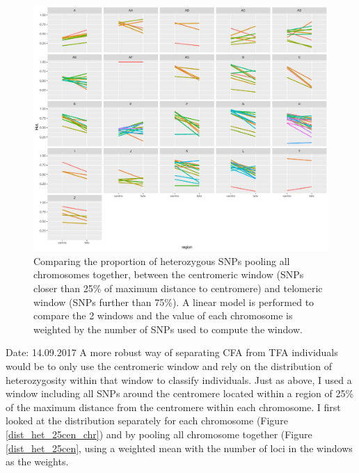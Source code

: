 \documentclass[10pt,a4paper]{report}
\begin{document}
\begin{figure}[h]
	\begin{center}
		\includegraphics[width=1\textwidth]{Num_CSD_loci/lm_centro25_telo_fam.pdf}
		\caption{Comparing the proportion of heterozygous SNPs pooling all chromosomes together, between the centromeric window (SNPs closer than 25\% of maximum distance to centromere) and telomeric window (SNPs further than 75\%). A linear model is performed to compare the 2 windows and the value of each chromosome is weighted by the number of SNPs used to compute the window.}
		\label{cen_tel_lm}
	\end{center}
\end{figure}
\FloatBarrier

Date: 14.09.2017
A more robust way of separating CFA from TFA individuals would be to only use the centromeric window and rely on the distribution of heterozygosity within that window to classify individuals. Just as above, I used a window including all SNPs around the centromere located within a region of 25\% of the maximum distance from the centromere within each chromosome. I first looked at the distribution separately for each chromosome (Figure \ref{dist_het_25cen_chr}) and by pooling all chromosome together (Figure \ref{dist_het_25cen}, using a weighted mean with the number of loci in the windows as the weights.
\end{document}
